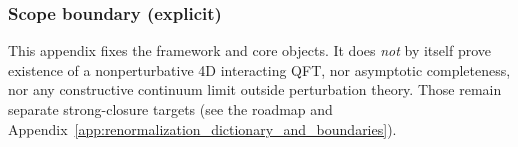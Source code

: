 \subsubsection{Scope boundary (explicit)}
\AuditTag This appendix fixes the framework and core objects.
It does \emph{not} by itself prove existence of a nonperturbative 4D interacting QFT, nor asymptotic completeness, nor any constructive continuum limit outside perturbation theory.
Those remain separate strong-closure targets (see the roadmap and Appendix~\ref{app:renormalization_dictionary_and_boundaries}).

